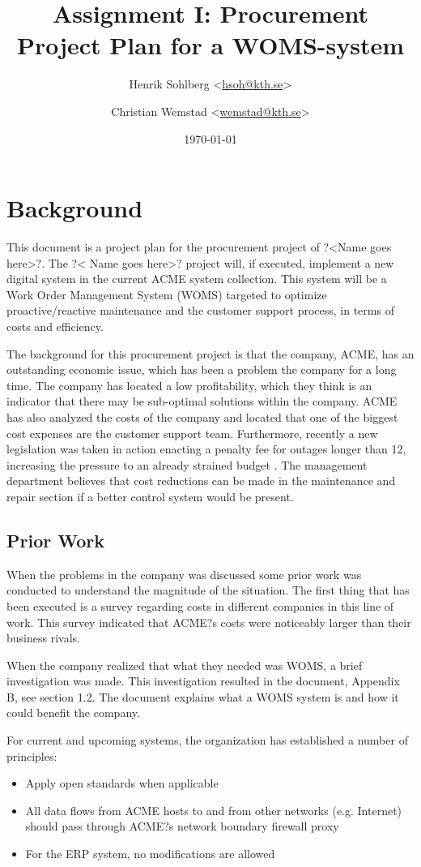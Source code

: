 \documentclass[a4paper]{article}
\title{Assignment I: Procurement Project Plan for a WOMS-system}
\author{Henrik Sohlberg <\href{mailto:hsoh@kth.se}{hsoh@kth.se}> %
\and Christian Wemstad <\href{mailto:wemstad@kth.se}{wemstad@kth.se}> %
}
\date{\today}
\begin{document}
\maketitle

\newpage
          
\tableofcontents
\newpage
\setcounter{page}{1} 
\section{Background}
\label{sec:background}
This document is a project plan for the procurement project of ?<Name goes here>?. The ?< Name goes here>? project will, if executed, implement a new digital system in the current ACME system collection. This system will be a Work Order Management System (WOMS) targeted to optimize proactive/reactive maintenance and the customer support process, in terms of costs and efficiency.

The background for this procurement project is that the company, ACME, has an outstanding economic issue, which has been a problem the company for a long time. The company has located a low profitability, which they think is an indicator that there may be sub-optimal solutions within the company. ACME has also analyzed the costs of the company and located that one of the biggest cost expenses are the customer support team. Furthermore, recently a new legislation was taken in action enacting a penalty fee for outages longer than 12, increasing the pressure to an already strained budget . The management department believes that cost reductions can be made in the maintenance and repair section if a better control system would be present. 

\subsection{Prior Work}
\label{sub:prior_work}
When the problems in the company was discussed some prior work was conducted to understand the magnitude of the situation. The first thing that has been executed is a survey regarding costs in different companies in this line of work. This survey indicated that ACME?s costs were noticeably larger than their business rivals.

When the company realized that what they needed was WOMS, a brief investigation was made. This investigation resulted in the document, Appendix B, see section 1.2. The document explains what a WOMS system is and how it could benefit the company.

For current and upcoming systems, the organization has established a number of principles:
\begin{itemize}
\item Apply open standards when applicable
\item All data flows from ACME hosts to and from other networks (e.g. Internet) should pass through ACME?s network boundary firewall proxy
\item For the ERP system, no modifications are allowed
\end{itemize}
\end{document}

